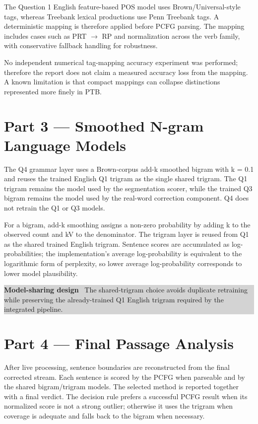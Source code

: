 \documentclass[11pt]{article}
\begin{document}
The Question 1 English feature-based POS model uses Brown/Universal-style tags, whereas Treebank lexical productions use Penn Treebank tags. A deterministic mapping is therefore applied before PCFG parsing. The mapping includes cases such as PRT $\rightarrow$ RP and normalization across the verb family, with conservative fallback handling for robustness.

No independent numerical tag-mapping accuracy experiment was performed; therefore the report does not claim a measured accuracy loss from the mapping. A known limitation is that compact mappings can collapse distinctions represented more finely in PTB.

\section{Part 3 --- Smoothed N-gram Language Models}

The Q4 grammar layer uses a Brown-corpus add-k smoothed bigram with k = 0.1 and reuses the trained English Q1 trigram as the single shared trigram. The Q1 trigram remains the model used by the segmentation scorer, while the trained Q3 bigram remains the model used by the real-word correction component. Q4 does not retrain the Q1 or Q3 models.

For a bigram, add-k smoothing assigns a non-zero probability by adding k to the observed count and kV to the denominator. The trigram layer is reused from Q1 as the shared trained English trigram. Sentence scores are accumulated as log-probabilities; the implementation's average log-probability is equivalent to the logarithmic form of perplexity, so lower average log-probability corresponds to lower model plausibility.

\noindent
\colorbox{lightgray}{
\parbox{\linewidth}{
\textbf{\color{accentblue}Model-sharing design} \ The shared-trigram choice avoids duplicate retraining while preserving the already-trained Q1 English trigram required by the integrated pipeline.
}}

\section{Part 4 --- Final Passage Analysis}

After live processing, sentence boundaries are reconstructed from the final corrected stream. Each sentence is scored by the PCFG when parseable and by the shared bigram/trigram models. The selected method is reported together with a final verdict. The decision rule prefers a successful PCFG result when its normalized score is not a strong outlier; otherwise it uses the trigram when coverage is adequate and falls back to the bigram when necessary.
\end{document}

